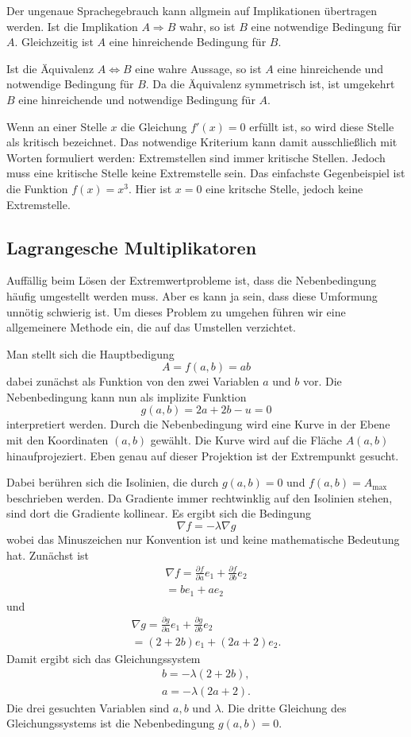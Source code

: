 \documentclass[a4paper,11pt,fleqn,twocolumn]{article}
\begin{document}
Der ungenaue Sprachegebrauch kann allgmein auf Implikationen
übertragen werden. Ist die Implikation
\(A\Rightarrow B\)
wahr, so ist \(B\) eine notwendige Bedingung für \(A\).
Gleichzeitig ist \(A\) eine hinreichende Bedingung für \(B\).

Ist die Äquivalenz \(A\Leftrightarrow B\) eine wahre Aussage, so ist
\(A\) eine hinreichende und notwendige Bedingung für \(B\). Da die
Äquivalenz symmetrisch ist, ist umgekehrt \(B\) eine hinreichende
und notwendige Bedingung für \(A\).

Wenn an einer Stelle \(x\) die Gleichung \(f'(x)=0\) erfüllt ist,
so wird diese Stelle als kritisch bezeichnet. Das notwendige
Kriterium kann damit ausschließlich mit Worten formuliert werden:
Extremstellen sind immer kritische Stellen. Jedoch muss eine kritische
Stelle keine Extremstelle sein. Das einfachste Gegenbeispiel ist
die Funktion \(f(x)=x^3\). Hier ist \(x=0\) eine kritsche Stelle,
jedoch keine Extremstelle.

\subsection*{Lagrangesche Multiplikatoren}

Auffällig beim Lösen der Extremwertprobleme ist, dass die
Nebenbedingung häufig umgestellt werden muss. Aber es kann ja sein,
dass diese Umformung unnötig schwierig ist. Um dieses Problem zu
umgehen führen wir eine allgemeinere Methode ein, die auf das
Umstellen verzichtet.

Man stellt sich die
Hauptbedigung
\[A=f(a,b)=ab\]
dabei zunächst als Funktion von den zwei
Variablen \(a\) und \(b\) vor. Die Nebenbedingung kann nun als
implizite Funktion
\[g(a,b)=2a+2b-u=0\]
interpretiert werden. Durch die
Nebenbedingung wird eine Kurve in der Ebene mit den Koordinaten
\((a,b)\) gewählt. Die Kurve wird auf die Fläche \(A(a,b)\)
hinaufprojeziert. Eben genau auf dieser Projektion ist der
Extrempunkt gesucht.

Dabei berühren sich die Isolinien, die durch \(g(a,b)=0\) und
\(f(a,b)=A_\mathrm{max}\) beschrieben werden. Da Gradiente immer
rechtwinklig auf den Isolinien stehen, sind dort die Gradiente
kollinear. Es ergibt sich die Bedingung
\[\nabla f = -\lambda\nabla g\]
wobei das Minuszeichen nur Konvention ist und keine mathematische
Bedeutung hat. Zunächst ist
\begin{gather*}
\nabla f = \frac{\partial f}{\partial a}e_1
+\frac{\partial f}{\partial b}e_2\\
= be_1+ae_2
\end{gather*}
und
\begin{gather*}
\nabla g = \frac{\partial g}{\partial a}e_1
+\frac{\partial g}{\partial b}e_2\\
= (2+2b)e_1+(2a+2)e_2.
\end{gather*}
Damit ergibt sich das Gleichungssystem
\begin{gather*}
b=-\lambda (2+2b),\\
a=-\lambda (2a+2).
\end{gather*}
Die drei gesuchten Variablen sind \(a,b\) und \(\lambda\).
Die dritte Gleichung des Gleichungssystems ist die Nebenbedingung
\(g(a,b)=0\).
\end{document}

